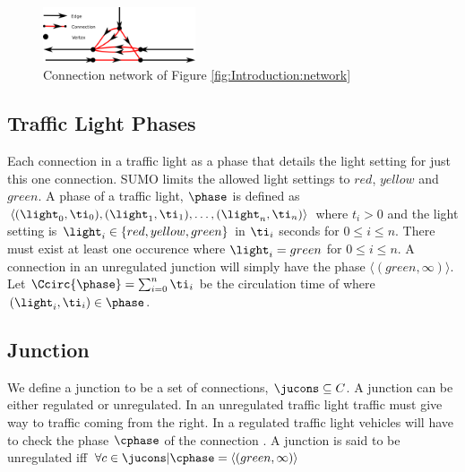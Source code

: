 \begin{figure}[h]
\centering
\includegraphics[width=0.4\textwidth]{../images/ConnectionNetwork.png}
\caption{Connection network of Figure \ref{fig:Introduction:network}}
\label{fig:Model:Connection}
\end{figure}

\subsection{Traffic Light Phases}\label{sec:phases}
Each connection in a traffic light as a phase that details the light setting for just this one connection.
SUMO limits the allowed light settings to $red$, $yellow$ and $green$.
A phase of a traffic light, $\phase$ is defined as $\langle(\light_0, \ti_0),(\light_1, \ti_1),\dots, (\light_n, \ti_n) \rangle$ where $t_i>0$ and the light setting is $\light_i\in \{red, yellow, green\}$ in $\ti_i$ seconds for $0 \leq i \leq n$.
There must exist at least one occurence where $\light_i = green$ for $0 \leq i \leq n$. 
A connection in an unregulated junction will simply have the phase $\langle(green, \infty)\rangle$.
Let $\Ccirc{\phase} = \sum_{i=0}^{n}\ti_i$ be the circulation time of \phase where $(\light_i, \ti_i)\in \phase$.

\subsection{Junction}
We define a junction \ju to be a set of connections, $\jucons \subseteq C$. 
A junction can be either regulated or unregulated. 
In an unregulated traffic light traffic must give way to traffic coming from the right. 
In a regulated traffic light vehicles will have to check the phase $\cphase$ of the connection \vehpos. 
A junction is said to be unregulated iff $\forall c \in \jucons | \cphase = \langle(green, \infty)\rangle$

